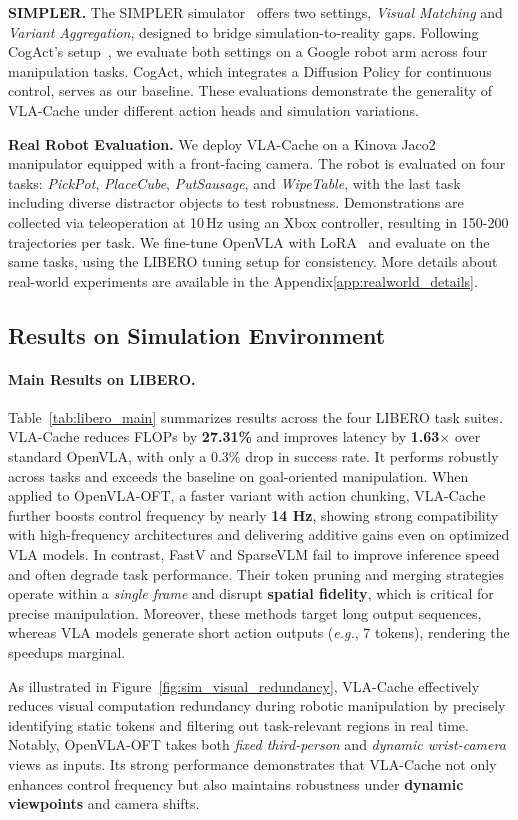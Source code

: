 \textbf{SIMPLER.}
The SIMPLER simulator~\cite{li2024evaluating} offers two settings, \emph{Visual Matching} and \emph{Variant Aggregation}, designed to bridge simulation-to-reality gaps. Following CogAct’s setup~\cite{li2024cogact}, we evaluate both settings on a Google robot arm across four manipulation tasks. CogAct, which integrates a Diffusion Policy for continuous control, serves as our baseline. These evaluations demonstrate the generality of VLA-Cache under different action heads and simulation variations.

\textbf{Real Robot Evaluation.}
We deploy VLA-Cache on a Kinova Jaco2 manipulator equipped with a front-facing camera. The robot is evaluated on four tasks: \emph{PickPot}, \emph{PlaceCube}, \emph{PutSausage}, and \emph{WipeTable}, with the last task including diverse distractor objects to test robustness.
Demonstrations are collected via teleoperation at 10\,Hz using an Xbox controller, resulting in 150-200 trajectories per task. We fine-tune OpenVLA with LoRA~\cite{hu2021lora} and evaluate on the same tasks, using the LIBERO tuning setup for consistency. More details about real-world experiments are available in the Appendix\ref{app:realworld_details}.

\subsection{Results on Simulation Environment}


\paragraph{Main Results on LIBERO.}
Table~\ref{tab:libero_main} summarizes results across the four LIBERO task suites. VLA-Cache reduces FLOPs by \textbf{27.31\%} and improves latency by \textbf{1.63$\times$} over standard OpenVLA, with only a 0.3\% drop in success rate. It performs robustly across tasks and exceeds the baseline on goal-oriented manipulation. When applied to OpenVLA-OFT, a faster variant with action chunking, VLA-Cache further boosts control frequency by nearly \textbf{14 Hz}, showing strong compatibility with high-frequency architectures and delivering additive gains even on optimized VLA models. 
In contrast, FastV and SparseVLM fail to improve inference speed and often degrade task performance. Their token pruning and merging strategies operate within a \textit{single frame} and disrupt \textbf{spatial fidelity}, which is critical for precise manipulation. Moreover, these methods target long output sequences, whereas VLA models generate short action outputs (\textit{e.g.}, 7 tokens), rendering the speedups marginal. 

As illustrated in Figure~\ref{fig:sim_visual_redundancy}, VLA-Cache effectively reduces visual computation redundancy during robotic manipulation by precisely identifying static tokens and filtering out task-relevant regions in real time. Notably, OpenVLA-OFT takes both \textit{fixed third-person} and \textit{dynamic wrist-camera} views as inputs. Its strong performance demonstrates that VLA-Cache not only enhances control frequency but also maintains robustness under \textbf{dynamic viewpoints} and camera shifts.

